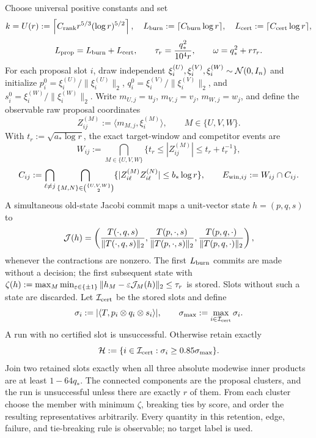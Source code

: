 Choose universal positive constants and set
\[
 k=U(r):=\left\lceil C_{\rm rank}r^{5/3}(\log r)^{5/2}\right\rceil,
 \quad L_{\rm burn}:=\lceil C_{\rm burn}\log r\rceil,
 \quad L_{\rm cert}:=\lceil C_{\rm cert}\log r\rceil,
\]
\[
 L_{\rm prop}=L_{\rm burn}+L_{\rm cert},\qquad
 \tau_r={q_*^2\over10^4r},\qquad \omega=q_*^2+r\tau_r.
\]
For each proposal slot $i$, draw independent
$\xi_i^{(U)},\xi_i^{(V)},\xi_i^{(W)}\sim {\cal N}(0,I_n)$ and initialize
$p_i^0=\xi_i^{(U)}/\|\xi_i^{(U)}\|_2$,
$q_i^0=\xi_i^{(V)}/\|\xi_i^{(V)}\|_2$, and
$s_i^0=\xi_i^{(W)}/\|\xi_i^{(W)}\|_2$. Write
$m_{U,j}=u_j$, $m_{V,j}=v_j$, $m_{W,j}=w_j$, and define the observable
raw proposal coordinates
\[
 Z_{ij}^{(M)}:=\langle m_{M,j},\xi_i^{(M)}\rangle,
 \qquad M\in\{U,V,W\}.
\]
With $t_r:=\sqrt{a_*\log r}$, the exact target-window and competitor events
are
\[
 W_{ij}:=\bigcap_{M\in\{U,V,W\}}
 \{t_r\le |Z_{ij}^{(M)}|\le t_r+t_r^{-1}\},
\]
\[
 C_{ij}:=\bigcap_{\ell\ne j}
 \bigcap_{\{M,N\}\in\binom{\{U,V,W\}}2}
 \{|Z_{i\ell}^{(M)}Z_{i\ell}^{(N)}|\le b_*\log r\},
 \qquad E_{{\rm win},ij}:=W_{ij}\cap C_{ij}.
\]
A simultaneous old-state Jacobi commit maps a unit-vector state
$h=(p,q,s)$ to
\[
 {\cal J}(h)=\left({T(\cdot,q,s)\over\|T(\cdot,q,s)\|_2},
 {T(p,\cdot,s)\over\|T(p,\cdot,s)\|_2},
 {T(p,q,\cdot)\over\|T(p,q,\cdot)\|_2}\right),
\]
whenever the contractions are nonzero. The first $L_{\rm burn}$ commits are
made without a decision; the first subsequent state with
$\zeta(h):=\max_M\min_{\varepsilon\in\{\pm1\}}
\|h_M-\varepsilon{\cal J}_M(h)\|_2\le\tau_r$ is stored. Slots without
such a state are discarded. Let ${\cal I}_{\rm cert}$ be the stored slots and
define
\[
 \sigma_i:=|\langle T,p_i\otimes q_i\otimes s_i\rangle|,
 \qquad \sigma_{\max}:=\max_{i\in{\cal I}_{\rm cert}}\sigma_i.
\]
A run with no certified slot is unsuccessful. Otherwise retain exactly
\[
 {\cal H}:=\{i\in{\cal I}_{\rm cert}:\sigma_i\ge0.85\sigma_{\max}\}.
\]
Join two retained slots exactly when all three absolute modewise inner
products are at least $1-64q_*$. The connected components are the proposal
clusters, and the run is unsuccessful unless there are exactly $r$ of them.
From each cluster choose the member with minimum $\zeta$, breaking ties by
score, and order the resulting representatives arbitrarily. Every quantity in
this retention, edge, failure, and tie-breaking rule is observable; no target
label is used.

